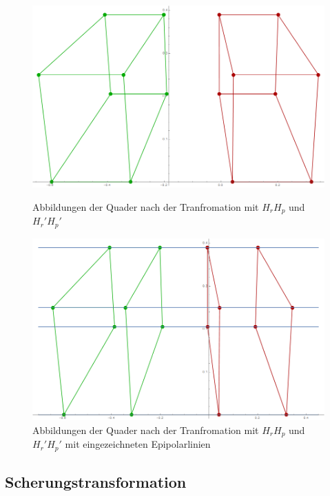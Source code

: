 \begin{figure}[!htb]
	\includegraphics[width=\linewidth]{images/Rectification_HrHp_same_Solutions.png}
	\caption[$H_rH_p$ und $H_r'H_p'$ Transformation]{Abbildungen der Quader nach der Tranfromation mit $H_rH_p$ und $H_r'H_p'$}
	\label{fig:RectSameHrHp1}
	\endminipage\hfill
	\includegraphics[width=\linewidth]{images/Rectification_HrHp_same_Solutions_Lines.png}
	\caption[$H_rH_p$ und $H_r'H_p'$ Transformation mit Epipolarlinien]{Abbildungen der Quader nach der Tranfromation mit $H_rH_p$ und $H_r'H_p'$ mit eingezeichneten Epipolarlinien}
	\label{fig:RectSameHrHp2}
	\endminipage\hfill
\end{figure}


\subsection{Scherungstransformation}

